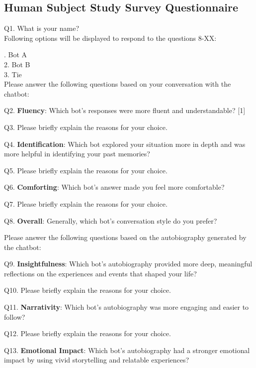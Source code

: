 \subsection{Human Subject Study Survey Questionnaire}
\begin{mdframed}
\small

Q1. What is your name?
\\

\noindent Following options will be displayed to respond to the questions 8-XX:

. Bot A\\
2. Bot B\\
3. Tie\\

\noindent Please answer the following questions based on your conversation with the chatbot:

\noindent Q2. \textbf{Fluency}: Which bot’s responses were more fluent and understandable? [1]

\noindent Q3. Please briefly explain the reasons for your choice.

\noindent Q4. \textbf{Identification}: Which bot explored your situation more in depth and was more helpful in identifying your past memories?

\noindent Q5. Please briefly explain the reasons for your choice.

\noindent Q6. \textbf{Comforting}: Which bot’s answer made you feel more comfortable?

\noindent Q7. Please briefly explain the reasons for your choice.

\noindent Q8. \textbf{Overall}: Generally, which bot’s conversation style do you prefer?

\noindent Please answer the following questions based on the autobiography generated by the chatbot:

\noindent Q9. \textbf{Insightfulness}: Which bot’s autobiography provided more deep, meaningful reflections on the experiences and events that shaped your life?

\noindent Q10. Please briefly explain the reasons for your choice.

\noindent Q11. \textbf{Narrativity}: Which bot's autobiography was more engaging and easier to follow?

\noindent Q12. Please briefly explain the reasons for your choice.

\noindent Q13. \textbf{Emotional Impact}: Which bot's autobiography had a stronger emotional impact by using vivid storytelling and relatable experiences?


\end{mdframed}
